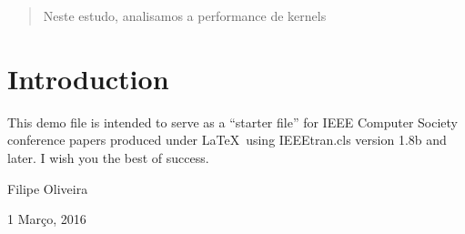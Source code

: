 \documentclass[conference,compsoc]{IEEEtran}
\begin{document}
\maketitle

\begin{abstract}

Neste estudo, analisamos a performance de kernels 
\end{abstract}





%
\IEEEpeerreviewmaketitle



\section{Introduction}
This demo file is intended to serve as a ``starter file''
for IEEE Computer Society conference papers produced under \LaTeX\ using
IEEEtran.cls version 1.8b and later.
I wish you the best of success.

\hfill Filipe Oliveira
 
\hfill 1 Março, 2016
\end{document}
